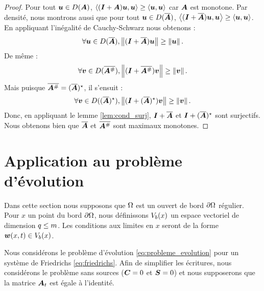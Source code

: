 \begin{proof}
	Pour tout $\bm{u} \in D(\bm{A})$,
	$\left\langle (\bm{I} + \bm{A}) \bm{u} , \bm{u} \right\rangle \ge
	\left\langle \bm{u} , \bm{u} \right\rangle$ car $\bm{A}$ est monotone.
	Par densité, nous montrons aussi que pour tout $\bm{u} \in D(\overline{\bm{A}})$,
	$\left\langle (\bm{I} + \overline{\bm{A}}) \bm{u} , \bm{u} \right\rangle \ge
	\left\langle \bm{u} , \bm{u} \right\rangle$.
	En appliquant l'inégalité de Cauchy-Schwarz nous obtenons :
	\begin{align}
		\forall \bm{u} \in D(\overline{\bm{A}}),
		\left\Vert(\bm{I} + \overline{\bm{A}}) \bm{u}\right\Vert \ge \left\Vert\bm{u}\right\Vert .
	\end{align}
	De même :
	\begin{align}
		\forall \bm{v} \in D(\overline{\bm{A}^{\#}}),
		\left\Vert(\bm{I} + \overline{\bm{A}^{\#}}) \bm{v}\right\Vert \ge \left\Vert\bm{v}\right\Vert .
	\end{align}
	Mais puisque $\overline{\bm{A}^{\#}} = (\overline{\bm{A}})^\star$,
	il s'ensuit :
	\begin{align}
		\forall \bm{v} \in D((\overline{\bm{A}})^\star),
		\left\Vert(\bm{I} + (\overline{\bm{A}})^\star) \bm{v}\right\Vert \ge \left\Vert\bm{v}\right\Vert .
	\end{align}
	Donc, en appliquant le lemme \ref{lem:cond_surj},
	$\bm{I} + \overline{\bm{A}}$ et $\bm{I} + (\overline{\bm{A}})^\star$
	sont surjectifs.
	Nous obtenons bien que $\overline{\bm{A}}$ et $\overline{\bm{A}^{\#}}$
	sont maximaux monotones.
\end{proof}



\section{Application au problème d'évolution}
\label{sect:application_pb_evol}


Dans cette section nous supposons que $\Omega$ est un ouvert
de bord $\partial\Omega$ régulier.
Pour $x$ un point du bord $\partial\Omega$,
nous définissons $V_b(x)$
un espace vectoriel de dimension $q \le m$.
Les conditions aux limites en $x$
seront de la forme $\bm{w}(x,t) \in V_b(x)$.

Nous considérons le problème d'évolution \eqref{eq:probleme_evolution}
pour un système de Friedrichs \eqref{eq:friedrichs}.
Afin de simplifier les écritures, nous considérons le problème
sans sources ($\bm{C} = 0$ et $\bm{S} = 0$) et nous supposerons
que la matrice $\bm{A}_{t}$ est égale à l’identité.

